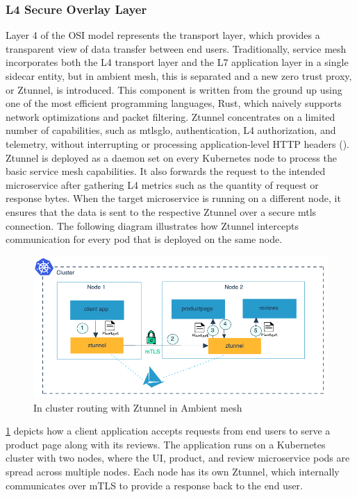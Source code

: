 \subsubsection{L4 Secure Overlay Layer}
Layer 4 of the OSI model represents the transport layer, which provides a transparent view of data transfer between end users. Traditionally, service mesh incorporates both the L4 transport layer and the L7 application layer in a single sidecar entity, but in ambient mesh, this is separated and a new zero trust proxy, or Ztunnel, is introduced. This component is written from the ground up using one of the most efficient programming languages, Rust, which naively supports network optimizations and packet filtering. Ztunnel concentrates on a limited number of capabilities, such as \Gls{mtlsglo}, authentication, L4 authorization, and telemetry, without interrupting or processing application-level HTTP headers (\cite{istioSun2023}). Ztunnel is deployed as a daemon set on every Kubernetes node to process the basic service mesh capabilities. It also forwards the request to the intended microservice after gathering L4 metrics such as the quantity of request or response bytes. When the target microservice is running on a different node, it ensures that the data is sent to the respective Ztunnel over a secure \acrshort{mtls} connection. The following diagram illustrates how Ztunnel intercepts communication for every pod that is deployed on the same node.

\begin{figure}[ht!]
  \centering
  \includegraphics[width=0.7\linewidth]{resources/ambient-routing-l4.png}
  \caption{In cluster routing with Ztunnel in Ambient mesh}
  \label{lr:ztunnelDesign}
\end{figure}

\ref{lr:ztunnelDesign} depicts how a client application accepts requests from end users to serve a product page along with its reviews. The application runs on a Kubernetes cluster with two nodes, where the UI, product, and review microservice pods are spread across multiple nodes. Each node has its own Ztunnel, which internally communicates over mTLS to provide a response back to the end user.

